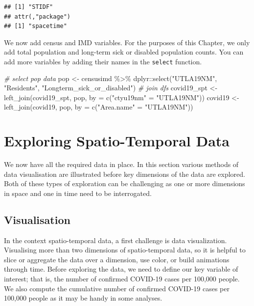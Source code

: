 \documentclass[
]{book}
\newenvironment{Shaded}{\begin{snugshade}}{\end{snugshade}}
\newcommand{\AttributeTok}[1]{\textcolor[rgb]{0.77,0.63,0.00}{#1}}
\newcommand{\CommentTok}[1]{\textcolor[rgb]{0.56,0.35,0.01}{\textit{#1}}}
\newcommand{\FunctionTok}[1]{\textcolor[rgb]{0.00,0.00,0.00}{#1}}
\newcommand{\NormalTok}[1]{#1}
\newcommand{\OtherTok}[1]{\textcolor[rgb]{0.56,0.35,0.01}{#1}}
\newcommand{\SpecialCharTok}[1]{\textcolor[rgb]{0.00,0.00,0.00}{#1}}
\newcommand{\StringTok}[1]{\textcolor[rgb]{0.31,0.60,0.02}{#1}}
\begin{document}
\begin{verbatim}
## [1] "STIDF"
## attr(,"package")
## [1] "spacetime"
\end{verbatim}

We now add census and IMD variables. For the purposes of this Chapter, we only add total population and long-term sick or disabled population counts. You can add more variables by adding their names in the \texttt{select} function.

\begin{Shaded}
\begin{Highlighting}[]
\CommentTok{\# select pop data}
\NormalTok{pop }\OtherTok{\textless{}{-}}\NormalTok{ censusimd }\SpecialCharTok{\%\textgreater{}\%}\NormalTok{ dplyr}\SpecialCharTok{::}\FunctionTok{select}\NormalTok{(}\StringTok{"UTLA19NM"}\NormalTok{, }\StringTok{"Residents"}\NormalTok{, }\StringTok{"Longterm\_sick\_or\_disabled"}\NormalTok{)}
\CommentTok{\# join dfs}
\NormalTok{covid19\_spt }\OtherTok{\textless{}{-}} \FunctionTok{left\_join}\NormalTok{(covid19\_spt, pop,}
                         \AttributeTok{by =} \FunctionTok{c}\NormalTok{(}\StringTok{"ctyu19nm"} \OtherTok{=} \StringTok{"UTLA19NM"}\NormalTok{))}
\NormalTok{covid19 }\OtherTok{\textless{}{-}} \FunctionTok{left\_join}\NormalTok{(covid19, pop, }\AttributeTok{by =} \FunctionTok{c}\NormalTok{(}\StringTok{"Area.name"} \OtherTok{=} \StringTok{"UTLA19NM"}\NormalTok{))}
\end{Highlighting}
\end{Shaded}

\hypertarget{exploring-spatio-temporal-data}{%
\section{Exploring Spatio-Temporal Data}\label{exploring-spatio-temporal-data}}

We now have all the required data in place. In this section various methods of data visualisation are illustrated before key dimensions of the data are explored. Both of these types of exploration can be challenging as one or more dimensions in space and one in time need to be interrogated.

\hypertarget{visualisation}{%
\subsection{Visualisation}\label{visualisation}}

In the context spatio-temporal data, a first challenge is data visualization. Visualising more than two dimensions of spatio-temporal data, so it is helpful to slice or aggregate the data over a dimension, use color, or build animations through time. Before exploring the data, we need to define our key variable of interest; that is, the number of confirmed COVID-19 cases per 100,000 people. We also compute the cumulative number of confirmed COVID-19 cases per 100,000 people as it may be handy in some analyses.
\end{document}
